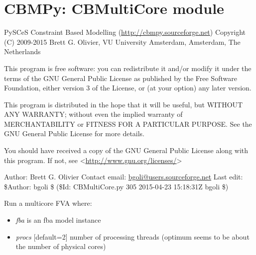 \documentclass[a4paper,11pt,english]{sphinxmanual}
\begin{document}
\section{CBMPy: CBMultiCore module}
\label{modules_doc:cbmpy-cbmulticore-module}
PySCeS Constraint Based Modelling (\href{http://cbmpy.sourceforge.net}{http://cbmpy.sourceforge.net})
Copyright (C) 2009-2015 Brett G. Olivier, VU University Amsterdam, Amsterdam, The Netherlands

This program is free software: you can redistribute it and/or modify
it under the terms of the GNU General Public License as published by
the Free Software Foundation, either version 3 of the License, or
(at your option) any later version.

This program is distributed in the hope that it will be useful,
but WITHOUT ANY WARRANTY; without even the implied warranty of
MERCHANTABILITY or FITNESS FOR A PARTICULAR PURPOSE.  See the
GNU General Public License for more details.

You should have received a copy of the GNU General Public License
along with this program.  If not, see \textless{}\href{http://www.gnu.org/licenses/}{http://www.gnu.org/licenses/}\textgreater{}

Author: Brett G. Olivier
Contact email: \href{mailto:bgoli@users.sourceforge.net}{bgoli@users.sourceforge.net}
Last edit: \$Author: bgoli \$ (\$Id: CBMultiCore.py 305 2015-04-23 15:18:31Z bgoli \$)

\begin{fulllineitems}
\label{modules_doc:cbmpy.CBMultiCore.grouper}
\end{fulllineitems}


\begin{fulllineitems}
\label{modules_doc:cbmpy.CBMultiCore.runMultiCoreFVA}
Run a multicore FVA where:
\begin{itemize}
\item {} 
\emph{fba} is an fba model instance

\item {} 
\emph{procs} {[}default=2{]} number of processing threads (optimum seems to be about the number of physical cores)

\end{itemize}

\end{fulllineitems}
\end{document}
